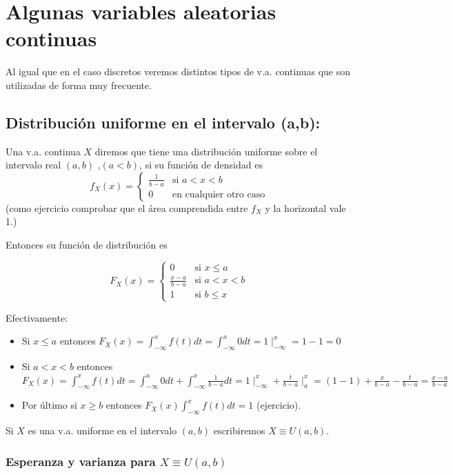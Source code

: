    \section{Algunas variables aleatorias continuas}
Al igual que en el caso discretos veremos distintos tipos de v.a. continuas que son
utilizadas de forma muy frecuente.

\subsection{Distribución uniforme en el intervalo (a,b):}

Una v.a. continua $X$ diremos que tiene una distribución uniforme sobre el intervalo real
$(a,b)$ ,$(a<b)$, si su función de densidad es $$f_X(x)=\left\{\begin{array}{ll}
\frac{1}{b-a} & \mbox{si } a<x<b\\ 0  & \mbox{en cualquier otro caso}
\end{array}
\right. $$ (como ejercicio comprobar que el área comprendida entre $f_X$ y la horizontal
vale 1.)

Entonces su función de distribución es

$$F_X(x)=\left\{\begin{array}{ll} 0  & \mbox{si } x\leq a\\
\frac{x-a}{b-a} & \mbox{si } a<x<b\\ 1  & \mbox{si } b\leq x
\end{array}
\right. $$

Efectivamente:

\begin{itemize}
    \item Si $x\leq a$ entonces $F_X(x)=\int_{-\infty}^{x} f(t) dt= \int_{-\infty}^{x}
    0 dt= 1\mid_{-\infty}^{x}=1-1=0$
    \item Si $a<x<b$ entonces $F_X(x)=\int_{-\infty}^{x} f(t) dt= \int_{-\infty}^{a}
    0 dt+\int_{-\infty}^{x} \frac{1}{b-a} dt= 1\mid_{-\infty}^{x}+
    \frac{t}{b-a}\mid_{a}^{x}=(1-1) +\frac{x}{b-a}-\frac{t}{b-a}=\frac{x-a}{b-a}$
    \item  Por último si $x\geq b$ entonces $F_X(x)\int_{-\infty}^{x} f(t)
    dt=1$ (ejercicio).
\end{itemize}

Si $X$ es una v.a. uniforme en el intervalo $(a,b)$ escribiremos $X\equiv U(a,b)$.

\subsubsection{Esperanza y varianza  para $X\equiv U(a,b)$}

